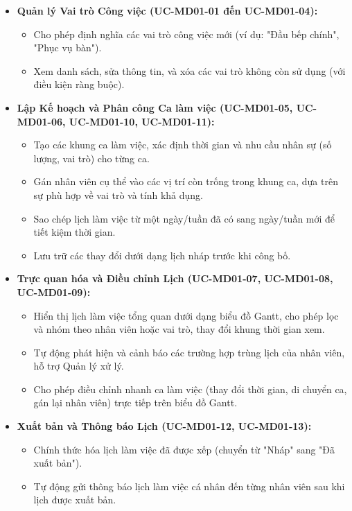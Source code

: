 \begin{itemize}
    \item \textbf{Quản lý Vai trò Công việc (UC-MD01-01 đến UC-MD01-04):}
    \begin{itemize}
        \item Cho phép định nghĩa các vai trò công việc mới (ví dụ: "Đầu bếp chính", "Phục vụ bàn").
        \item Xem danh sách, sửa thông tin, và xóa các vai trò không còn sử dụng (với điều kiện ràng buộc).
    \end{itemize}

    \item \textbf{Lập Kế hoạch và Phân công Ca làm việc (UC-MD01-05, UC-MD01-06, UC-MD01-10, UC-MD01-11):}
    \begin{itemize}
        \item Tạo các khung ca làm việc, xác định thời gian và nhu cầu nhân sự (số lượng, vai trò) cho từng ca.
        \item Gán nhân viên cụ thể vào các vị trí còn trống trong khung ca, dựa trên sự phù hợp về vai trò và tính khả dụng.
        \item Sao chép lịch làm việc từ một ngày/tuần đã có sang ngày/tuần mới để tiết kiệm thời gian.
        \item Lưu trữ các thay đổi dưới dạng lịch nháp trước khi công bố.
    \end{itemize}

    \item \textbf{Trực quan hóa và Điều chỉnh Lịch (UC-MD01-07, UC-MD01-08, UC-MD01-09):}
    \begin{itemize}
        \item Hiển thị lịch làm việc tổng quan dưới dạng biểu đồ Gantt, cho phép lọc và nhóm theo nhân viên hoặc vai trò, thay đổi khung thời gian xem.
        \item Tự động phát hiện và cảnh báo các trường hợp trùng lịch của nhân viên, hỗ trợ Quản lý xử lý.
        \item Cho phép điều chỉnh nhanh ca làm việc (thay đổi thời gian, di chuyển ca, gán lại nhân viên) trực tiếp trên biểu đồ Gantt.
    \end{itemize}

    \item \textbf{Xuất bản và Thông báo Lịch (UC-MD01-12, UC-MD01-13):}
    \begin{itemize}
        \item Chính thức hóa lịch làm việc đã được xếp (chuyển từ "Nháp" sang "Đã xuất bản").
        \item Tự động gửi thông báo lịch làm việc cá nhân đến từng nhân viên sau khi lịch được xuất bản.
    \end{itemize}


\end{itemize}
